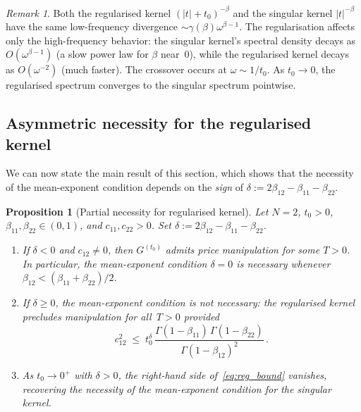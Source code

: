 \documentclass[12pt]{article}
\newtheorem{proposition}[theorem]{Proposition}
\theoremstyle{definition}
\theoremstyle{remark}
\newtheorem{remark}[theorem]{Remark}
\begin{document}
\begin{remark}\label{rem:freq_crossover}
Both the regularised kernel $(|t|+t_0)^{-\beta}$ and the singular kernel
$|t|^{-\beta}$ have the same low-frequency divergence
$\sim\gamma(\beta)\omega^{\beta-1}$. The regularisation affects only the
high-frequency behavior: the singular kernel's spectral density decays as
$O(\omega^{\beta-1})$ (a slow power law for $\beta$ near~$0$), while the
regularised kernel decays as $O(\omega^{-2})$ (much faster). The crossover
occurs at $\omega \sim 1/t_0$. As $t_0\to 0$, the regularised spectrum
converges to the singular spectrum pointwise.
\end{remark}

\subsection{Asymmetric necessity for the regularised kernel}\label{sec:reg_necessity}

We can now state the main result of this section, which shows that the
necessity of the mean-exponent condition depends on the \emph{sign} of
$\delta := 2\beta_{12} - \beta_{11} - \beta_{22}$.

\begin{proposition}[Partial necessity for regularised kernel]\label{prop:reg_necessity}
Let $N=2$, $t_0 > 0$, $\beta_{11}, \beta_{22}\in(0,1)$, and $c_{11}, c_{22} > 0$.
Set $\delta := 2\beta_{12} - \beta_{11} - \beta_{22}$.
\begin{enumerate}[label=\textup{(\roman*)},nosep]
  \item If $\delta < 0$ and $c_{12}\neq 0$, then $G^{(t_0)}$ admits price
    manipulation for some $T>0$.  In particular, the mean-exponent condition
    $\delta = 0$ is necessary whenever $\beta_{12} < (\beta_{11}+\beta_{22})/2$.
  \item If $\delta \ge 0$, the mean-exponent condition is \emph{not} necessary:
    the regularised kernel precludes manipulation for all~$T>0$ provided
    \begin{equation}\label{eq:reg_bound}
      c_{12}^2 \;\le\; t_0^{\delta}\,
        \frac{\Gamma(1-\beta_{11})\,\Gamma(1-\beta_{22})}{\Gamma(1-\beta_{12})^2}\,.
    \end{equation}
  \item As $t_0\to 0^+$ with $\delta > 0$, the right-hand side
    of~\eqref{eq:reg_bound} vanishes, recovering the necessity of the
    mean-exponent condition for the singular kernel.
\end{enumerate}
\end{proposition}
\end{document}
